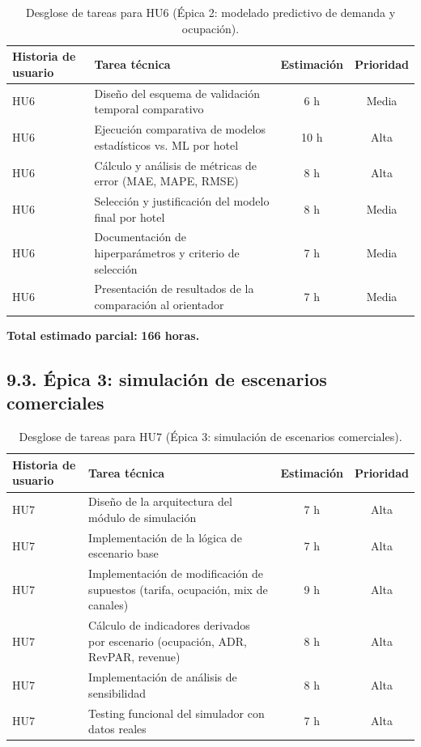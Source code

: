 \documentclass[
11pt, %
]{charter}
\begin{document}
\begin{table}[H]
\centering
\begin{tabularx}{\linewidth}{@{}|X|X|c|c|@{}}
\hline
\rowcolor[HTML]{C0C0C0}
Historia de usuario & Tarea técnica & Estimación & Prioridad \\ \hline
HU6 & Diseño del esquema de validación temporal comparativo & 6 h & Media \\ \hline
HU6 & Ejecución comparativa de modelos estadísticos vs. ML por hotel & 10 h & Alta \\ \hline
HU6 & Cálculo y análisis de métricas de error (MAE, MAPE, RMSE) & 8 h & Alta \\ \hline
HU6 & Selección y justificación del modelo final por hotel & 8 h & Media \\ \hline
HU6 & Documentación de hiperparámetros y criterio de selección & 7 h & Media \\ \hline
HU6 & Presentación de resultados de la comparación al orientador & 7 h & Media \\ \hline
\end{tabularx}
\caption{Desglose de tareas para HU6 (Épica 2: modelado predictivo de demanda y ocupación).}
\end{table}
 
\noindent
\textbf{Total estimado parcial:} \textbf{166 horas.}
 
\subsection*{9.3. Épica 3: simulación de escenarios comerciales}
 
\begin{table}[H]
\centering
\begin{tabularx}{\linewidth}{@{}|X|X|c|c|@{}}
\hline
\rowcolor[HTML]{C0C0C0}
Historia de usuario & Tarea técnica & Estimación & Prioridad \\ \hline
HU7 & Diseño de la arquitectura del módulo de simulación & 7 h & Alta \\ \hline
HU7 & Implementación de la lógica de escenario base & 7 h & Alta \\ \hline
HU7 & Implementación de modificación de supuestos (tarifa, ocupación, mix de canales) & 9 h & Alta \\ \hline
HU7 & Cálculo de indicadores derivados por escenario (ocupación, ADR, RevPAR, revenue) & 8 h & Alta \\ \hline
HU7 & Implementación de análisis de sensibilidad & 8 h & Alta \\ \hline
HU7 & Testing funcional del simulador con datos reales & 7 h & Alta \\ \hline
\end{tabularx}
\caption{Desglose de tareas para HU7 (Épica 3: simulación de escenarios comerciales).}
\end{table}
 
\end{document}
